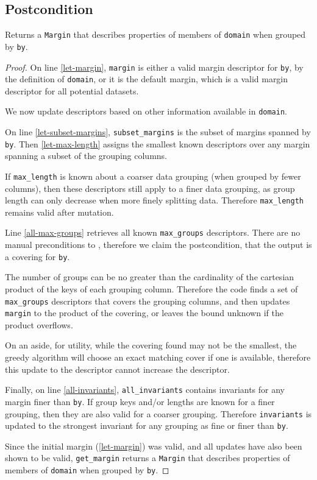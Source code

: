 \documentclass{article}
\begin{document}
\subsection*{Postcondition}
\begin{theorem}
Returns a \texttt{Margin} that describes properties of members of \texttt{domain} when grouped by \texttt{by}.
\end{theorem}
\begin{proof}
    On line \ref{let-margin}, \texttt{margin} is either a valid margin descriptor
    for \texttt{by}, by the definition of \texttt{domain},
    or it is the default margin, which is a valid margin descriptor for all potential datasets.

    We now update descriptors based on other information available in \texttt{domain}.

    On line \ref{let-subset-margins},
    \texttt{subset\_margins} is the subset of margins spanned by \texttt{by}.
    Then \ref{let-max-length} assigns the smallest known descriptors over any margin spanning a subset of the grouping columns.

    If \texttt{max\_length} is known about a coarser data grouping (when grouped by fewer columns),
    then these descriptors still apply to a finer data grouping, as group length can only decrease when more finely splitting data.
    Therefore \texttt{max\_length} remains valid after mutation.

    Line \ref{all-max-groups} retrieves all known \texttt{max\_groups} descriptors.
    There are no manual preconditions to ,
    therefore we claim the postcondition, that the output is a covering for \texttt{by}.

    The number of groups can be no greater than the cardinality of the cartesian product of the keys of each grouping column.
    Therefore the code finds a set of \texttt{max\_groups} descriptors that covers the grouping columns,
    and then updates \texttt{margin} to the product of the covering, or leaves the bound unknown if the product overflows.

    On an aside, for utility, while the covering found may not be the smallest,
    the greedy algorithm will choose an exact matching cover if one is available,
    therefore this update to the descriptor cannot increase the descriptor.

    Finally, on line \ref{all-invariants}, \texttt{all\_invariants} contains invariants for any margin finer than \texttt{by}.
    If group keys and/or lengths are known for a finer grouping, then they are also valid for a coarser grouping.
    Therefore \texttt{invariants} is updated to the strongest invariant for any grouping as fine or finer than \texttt{by}.

    Since the initial margin (\ref{let-margin}) was valid, and all updates have also been shown to be valid,
    \texttt{get\_margin} returns a \texttt{Margin} that describes properties of members of \texttt{domain} when grouped by \texttt{by}.
\end{proof}
\end{document}
